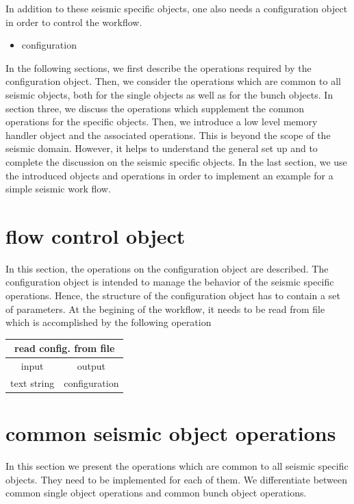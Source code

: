 \documentclass[12pt,a4paper]{article}
\begin{document}
In addition to these seismic specific objects, one also needs a configuration object in order to control 
the workflow.
\begin{itemize}
\item configuration
\end{itemize}
In the following sections, we first describe the operations required by the configuration
object. Then, we consider the operations which are common to
all seismic objects, both for the single objects as well as for the 
bunch objects. In section three, we discuss the operations which 
supplement the common operations for the specific objects. Then, we introduce 
a low level memory handler object and the associated operations. This is beyond 
the scope of the seismic domain. However, it helps to understand the general set up
and to complete the discussion on the seismic specific objects. 
In the last section, we use the introduced objects
and operations in order to implement an example for a 
simple seismic work flow. 

\section{flow control object}

In this section, the operations on the configuration object are described.
The configuration object is intended to manage the behavior of the 
seismic specific operations. Hence, the structure of the configuration 
object has to contain a set of parameters.
At the begining of the workflow, it needs to be read from file which is accomplished by
the following operation 
\newline
\begin{center}
\begin{tabular}{|c|c|}
\hline
\multicolumn{2}{|c|}{read config. from file}\\
\hline\hline
input & output \\
\hline
text string & configuration \\
\hline
\end{tabular}
\end{center}

\section{common seismic object operations}

In this section we present the operations which are common
to all seismic specific objects. They need to be implemented 
for each of them. We differentiate between common single object 
operations and common bunch object operations.
\end{document}
